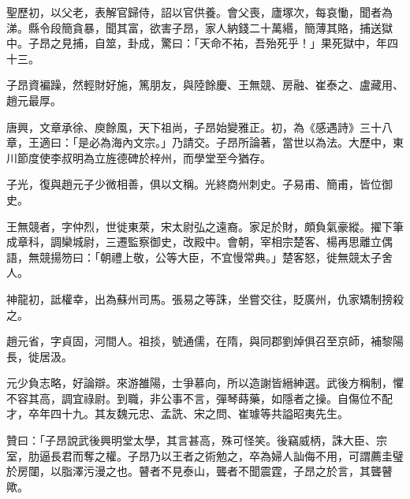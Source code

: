 \begin{pinyinscope}
 聖歷初，以父老，表解官歸侍，詔以官供養。會父喪，廬塚次，每哀慟，聞者為涕。縣令段簡貪暴，聞其富，欲害子昂，家人納錢二十萬緡，簡薄其賂，捕送獄中。子昂之見捕，自筮，卦成，驚曰：「天命不祐，吾殆死乎！」果死獄中，年四十三。



 子昂資褊躁，然輕財好施，篤朋友，與陸餘慶、王無競、房融、崔泰之、盧藏用、趙元最厚。



 唐興，文章承徐、庾餘風，天下祖尚，子昂始變雅正。初，為《感遇詩》三十八章，王適曰：「是必為海內文宗。」乃請交。子昂所論著，當世以為法。大歷中，東川節度使李叔明為立旌德碑於梓州，而學堂至今猶存。



 子光，復與趙元子少微相善，俱以文稱。光終商州刺史。子易甫、簡甫，皆位御史。



 王無競者，字仲烈，世徙東萊，宋太尉弘之遠裔。家足於財，頗負氣豪縱。擢下筆成章科，調欒城尉，三遷監察御史，改殿中。會朝，宰相宗楚客、楊再思離立偶語，無競揚笏曰：「朝禮上敬，公等大臣，不宜慢常典。」楚客怒，徙無競太子舍人。



 神龍初，詆權幸，出為蘇州司馬。張易之等誅，坐嘗交往，貶廣州，仇家矯制搒殺之。



 趙元省，字貞固，河間人。祖掞，號通儒，在隋，與同郡劉焯俱召至京師，補黎陽長，徙居汲。



 元少負志略，好論辯。來游雒陽，士爭慕向，所以造謝皆縉紳選。武後方稱制，懼不容其高，調宜祿尉。到職，非公事不言，彈琴蒔藥，如隱者之操。自傷位不配才，卒年四十九。其友魏元忠、孟詵、宋之問、崔璩等共謚昭夷先生。



 贊曰：「子昂說武後興明堂太學，其言甚高，殊可怪笑。後竊威柄，誅大臣、宗室，肋逼長君而奪之權。子昂乃以王者之術勉之，卒為婦人訕侮不用，可謂薦圭璧於房闥，以脂澤污漫之也。瞽者不見泰山，聾者不聞震霆，子昂之於言，其聾瞽歟。



\end{pinyinscope}